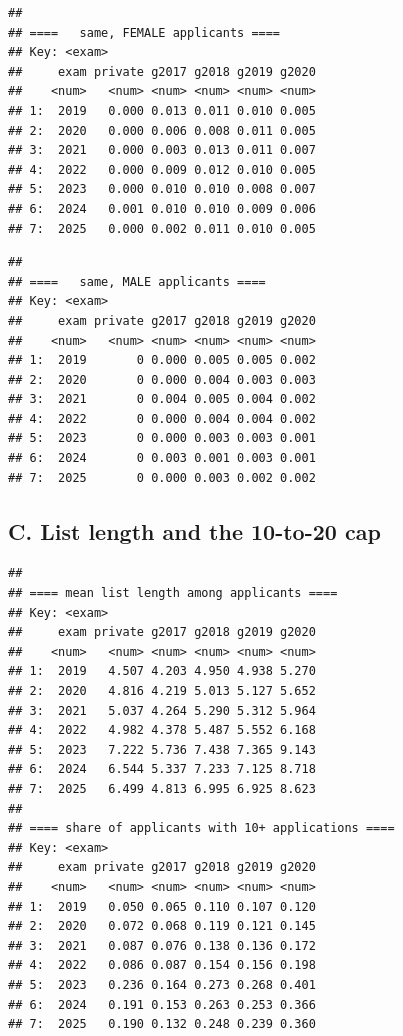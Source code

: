 \documentclass[
]{article}
\begin{document}
\begin{verbatim}
## 
## ====   same, FEMALE applicants ====
## Key: <exam>
##     exam private g2017 g2018 g2019 g2020
##    <num>   <num> <num> <num> <num> <num>
## 1:  2019   0.000 0.013 0.011 0.010 0.005
## 2:  2020   0.000 0.006 0.008 0.011 0.005
## 3:  2021   0.000 0.003 0.013 0.011 0.007
## 4:  2022   0.000 0.009 0.012 0.010 0.005
## 5:  2023   0.000 0.010 0.010 0.008 0.007
## 6:  2024   0.001 0.010 0.010 0.009 0.006
## 7:  2025   0.000 0.002 0.011 0.010 0.005
\end{verbatim}

\begin{verbatim}
## 
## ====   same, MALE applicants ====
## Key: <exam>
##     exam private g2017 g2018 g2019 g2020
##    <num>   <num> <num> <num> <num> <num>
## 1:  2019       0 0.000 0.005 0.005 0.002
## 2:  2020       0 0.000 0.004 0.003 0.003
## 3:  2021       0 0.004 0.005 0.004 0.002
## 4:  2022       0 0.000 0.004 0.004 0.002
## 5:  2023       0 0.000 0.003 0.003 0.001
## 6:  2024       0 0.003 0.001 0.003 0.001
## 7:  2025       0 0.000 0.003 0.002 0.002
\end{verbatim}

\hypertarget{c.-list-length-and-the-10-to-20-cap}{%
\subsection{C. List length and the 10-to-20
cap}\label{c.-list-length-and-the-10-to-20-cap}}

\begin{verbatim}
## 
## ==== mean list length among applicants ====
## Key: <exam>
##     exam private g2017 g2018 g2019 g2020
##    <num>   <num> <num> <num> <num> <num>
## 1:  2019   4.507 4.203 4.950 4.938 5.270
## 2:  2020   4.816 4.219 5.013 5.127 5.652
## 3:  2021   5.037 4.264 5.290 5.312 5.964
## 4:  2022   4.982 4.378 5.487 5.552 6.168
## 5:  2023   7.222 5.736 7.438 7.365 9.143
## 6:  2024   6.544 5.337 7.233 7.125 8.718
## 7:  2025   6.499 4.813 6.995 6.925 8.623
## 
## ==== share of applicants with 10+ applications ====
## Key: <exam>
##     exam private g2017 g2018 g2019 g2020
##    <num>   <num> <num> <num> <num> <num>
## 1:  2019   0.050 0.065 0.110 0.107 0.120
## 2:  2020   0.072 0.068 0.119 0.121 0.145
## 3:  2021   0.087 0.076 0.138 0.136 0.172
## 4:  2022   0.086 0.087 0.154 0.156 0.198
## 5:  2023   0.236 0.164 0.273 0.268 0.401
## 6:  2024   0.191 0.153 0.263 0.253 0.366
## 7:  2025   0.190 0.132 0.248 0.239 0.360
\end{verbatim}
\end{document}
